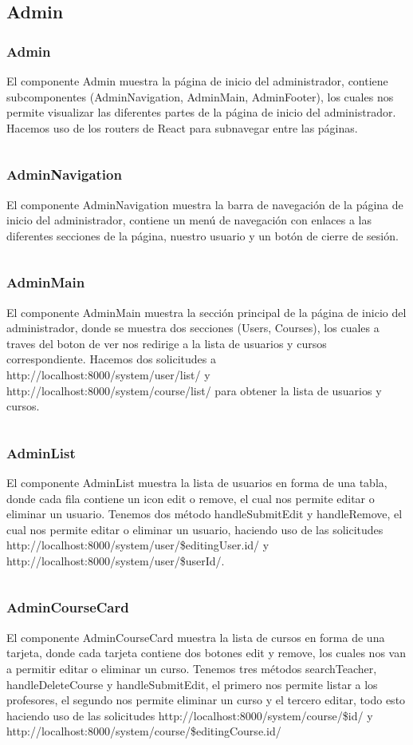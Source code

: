 \documentclass{article}
\begin{document}
\subsection{Admin}
\subsubsection{Admin}
El componente Admin muestra la página de inicio del administrador, contiene subcomponentes (AdminNavigation, AdminMain, AdminFooter), los cuales nos permite visualizar las diferentes partes de la página de inicio del administrador. Hacemos uso de los routers de React para subnavegar entre las páginas.
\inputminted{javascript}{../fronted/src/designUI/Admin/Admin.jsx}
\subsubsection{AdminNavigation}
El componente AdminNavigation muestra la barra de navegación de la página de inicio del administrador, contiene un menú de navegación con enlaces a las diferentes secciones de la página, nuestro usuario y un botón de cierre de sesión.
\inputminted{javascript}{../fronted/src/designUI/Admin/AdminNavigation.jsx}
\subsubsection{AdminMain}
El componente AdminMain muestra la sección principal de la página de inicio del administrador, donde se muestra dos secciones (Users, Courses), los cuales a traves del boton de ver nos redirige a la lista de usuarios y cursos correspondiente. Hacemos dos solicitudes a http://localhost:8000/system/user/list/ y http://localhost:8000/system/course/list/ para obtener la lista de usuarios y cursos.
\inputminted{javascript}{../fronted/src/designUI/Admin/AdminMain.jsx}
\subsubsection{AdminList}
El componente AdminList muestra la lista de usuarios en forma de una tabla, donde cada fila contiene un icon edit o remove, el cual nos permite editar o eliminar un usuario. Tenemos dos método handleSubmitEdit y handleRemove, el cual nos permite editar o eliminar un usuario, haciendo uso de las solicitudes http://localhost:8000/system/user/\${editingUser.id}/ y http://localhost:8000/system/user/\${userId}/.
\inputminted{javascript}{../fronted/src/designUI/Admin/AdminList.jsx}
\subsubsection{AdminCourseCard}
El componente AdminCourseCard muestra la lista de cursos en forma de una tarjeta, donde cada tarjeta contiene dos botones edit y remove, los cuales nos van a permitir editar o eliminar un curso. Tenemos tres métodos searchTeacher, handleDeleteCourse y handleSubmitEdit, el primero nos permite listar a los profesores, el segundo nos permite eliminar un curso y el tercero editar, todo esto haciendo uso de las solicitudes http://localhost:8000/system/course/\${id}/ y http://localhost:8000/system/course/\${editingCourse.id}/
\inputminted{javascript}{../fronted/src/designUI/Admin/AdminCourseCard.jsx}
\end{document}
